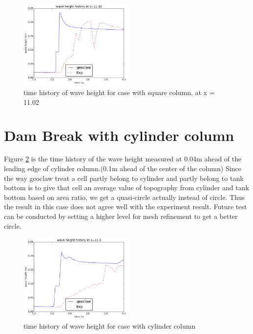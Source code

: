 \documentclass[11pt]{article}
\begin{document}
\begin{figure}[h!]
    \centering
    \includegraphics[width=0.5\textwidth]{./plots/waveheight_square_x1102}
    \caption{time history of wave height for case with square column, at x = 11.02}
    \label{fig:waveheight_square_x=11.02}
\end{figure}



\section{Dam Break with cylinder column}\label{Sec:Cylinder}
Figure \ref{fig:waveheight_cylinder_x=11.0} is the time history of the wave height measured at 0.04m ahead of the leading edge of cylinder column.(0.1m ahead of the center of the column)
Since the way geoclaw treat a cell partly belong to cylinder and partly belong to tank bottom is to give that cell an average value of topography from cylinder and tank bottom based on area ratio, we get a quasi-circle actually instead of circle. Thus the result in this case does not agree well with the experiment result. 
Future test can be conducted by setting a higher level for mesh refinement to get a better circle.
\begin{figure}[h!]
    \centering
    \includegraphics[width=0.5\textwidth]{./plots/waveheight_cylinder_x11}
    \caption{time history of wave height for case with cylinder column}
    \label{fig:waveheight_cylinder_x=11.0}
\end{figure}
\end{document}
